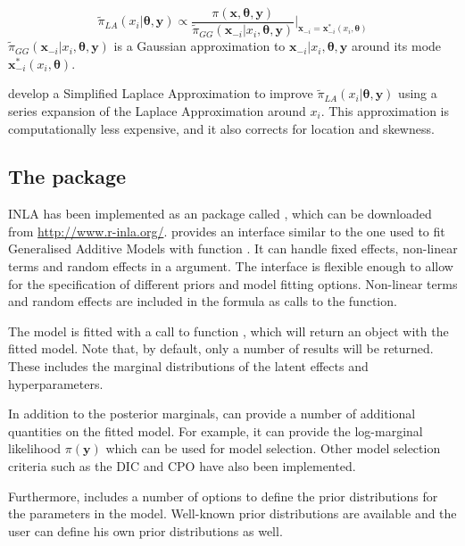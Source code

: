 \documentclass[article]{jss}
\begin{document}
\begin{equation}
\tilde\pi_{LA}(x_i|\mathbf{\theta}, \mathbf{y}) \propto 
\frac{\pi(\mathbf{x}, \mathbf{\theta}, \mathbf{y})}
{\tilde\pi_{GG}(\mathbf{x}_{-i}|x_i, \mathbf{\theta}, \mathbf{y})}
\bigg|_{\mathbf{x}_{-i}=\mathbf{x}^*_{-i}(x_i, \mathbf{\theta})}
\end{equation}
\noindent
$\tilde\pi_{GG}(\mathbf{x}_{-i}|x_i, \mathbf{\theta}, \mathbf{y})$ is a
Gaussian  approximation to $\mathbf{x}_{-i}|x_i, \mathbf{\theta}, \mathbf{y}$
around its mode $\mathbf{x}^*_{-i}(x_i, \mathbf{\theta})$.

\citet{isi:000264374200002} develop a Simplified Laplace Approximation to
improve $\tilde\pi_{LA}(x_i|\mathbf{\theta}, \mathbf{y})$ using a series
expansion of the Laplace Approximation around $x_i$. This approximation is
computationally less expensive, and it also corrects for location and
skewness.


\subsection[The R-INLA package]{The  package}

INLA has been implemented as an  package called ,
which can be downloaded from \url{http://www.r-inla.org/}. 
provides an interface similar to the one used to fit Generalised Additive
Models with function . It can handle fixed effects, non-linear terms
and random effects in a  argument. The interface is flexible
enough to allow for the specification of different priors and model fitting
options. Non-linear terms and random effects are included in the formula as
calls to the  function. 


The model is fitted with a call to function , which will return an
 object with the fitted model. Note that, by default, only a number
of results will be returned. These includes the marginal distributions of
the latent effects and hyperparameters. 


In addition to the posterior marginals,  can provide a number
of additional quantities on the fitted model. For example, it can 
provide the log-marginal likelihood $\pi(\mathbf{y})$ which can be used
for model selection. Other model selection criteria such as the DIC 
\citep{Spiegelhalteretal:2002} and CPO \citep{Heldetal:2010} have also
been implemented.

Furthermore,  includes a number of options to define the
prior distributions for the parameters in the model. Well-known
prior distributions are available and the user can define his own prior
distributions as well.
\end{document}
